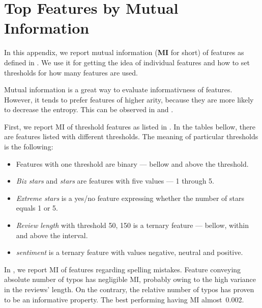 \chapter{Top Features by Mutual Information}\label{app:mi}

In this appendix, we report mutual information (\textbf{MI} for short) of features as defined in .
We use it for getting the idea of individual features and how to set thresholds for how many features
are used.

Mutual information is a great way to evaluate informativness of features.
However, it tends to prefer features of higher arity, because
they are more likely to decrease the entropy.
This can be observed in  and .

First, we report MI of threshold features as listed in .
In the tables bellow, there are features listed with different thresholds.
The meaning of particular thresholds is the following:

\begin{itemize}
\item Features with one threshold are binary --- bellow and above the threshold.
\item \textit{Biz stars} and \textit{stars} are features with five values --- 1 through 5.
\item \textit{Extreme stars} is a yes/no feature expressing whether the number of stars equals 1 or 5.
\item \textit{Review length} with threshold 50, 150 is a ternary feature --- bellow, within and above the interval.
\item \textit{sentiment} is a ternary feature with values negative, neutral and positive.
\end{itemize}


In , we report MI of features regarding spelling mistakes.
Feature conveying absolute number of typos has negligible MI, probably owing to the high variance in the reviews' length.
On the contrary, the relative number of typos has proven to be an informative property.
The best performing having MI almost~0.002.


